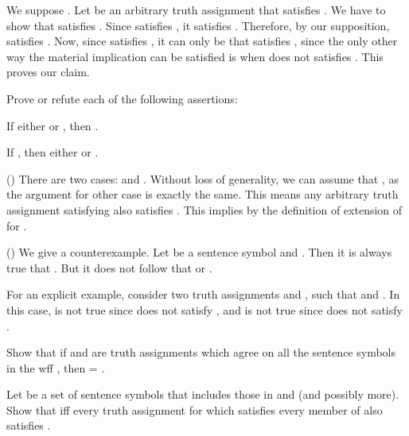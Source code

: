 		  \qquad
		We suppose . Let  be an arbitrary truth assignment that satisfies . We have to show that  satisfies . Since  satisfies , it satisfies . Therefore, by our supposition,  satisfies . Now, since  satisfies , it can only be that  satisfies , since the only other way the material implication can be satisfied is when  does not satisfies . This proves our claim.
	\stopsolution

	\startexercise [title={Enderton, 1.2.5}]
		Prove or refute each of the following assertions:
		\startitemize [a, joinedup]
			\item  If either  or , then .
			\item  If , then either  or .
		\stopitemize
	\stopexercise
	\startsolution
		\startitemize [a]
			\item  ()\qquad
				There are two cases:  and . Without loss of generality, we can assume that , as the argument for other case is exactly the same. This means any arbitrary truth assignment  satisfying  also satisfies . This implies  by the definition of extension of  for .

			\item  ()\qquad
				We give a counterexample. Let  be a sentence symbol and . Then it is always true that . But it does not follow that  or .

				For an explicit example, consider two truth assignments  and , such that  and . In this case,  is not true since  does not satisfy , and  is not true since  does not satisfy .
		\stopitemize
	\stopsolution

	\page
	\startexercise [title={Enderton, 1.2.6}]
		\startitemize [a, joinedup]

			\item  Show that if  and  are truth assignments which agree on all the sentence symbols in the wff , then  = .
			
			\item  Let  be a set of sentence symbols that includes those in  and  (and possibly more). Show that  iff every truth assignment for  which satisfies every member of  also satisfies .

